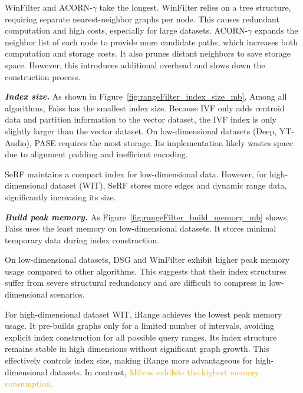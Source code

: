 \documentclass[sigconf, nonacm]{acmart}
\begin{document}
	
	WinFilter and ACORN-\(\gamma\) take the longest.
	WinFilter relies on a tree structure, requiring separate nearest-neighbor graphs per node. This causes redundant computation and high costs, especially for large datasets.
	ACORN-\(\gamma\) expands the neighbor list of each node to provide more candidate paths, which increases both computation and storage costs. It also prunes distant neighbors to save storage space. However, this introduces additional overhead and slows down the construction process.
	
	\textit{\textbf{Index size.}} 
	As shown in Figure~\ref{fig:rangeFilter_index_size_mb}, Among all algorithms, Faiss has the smallest index size. Because IVF only adds centroid data and partition information to the vector dataset, the IVF index is only slightly larger than the vector dataset.
	On low-dimensional datasets (Deep, YT-Audio), PASE requires the most storage. Its implementation likely wastes space due to alignment padding and inefficient encoding. %
	
	SeRF maintains a compact index for low-dimensional data. However, for high-dimensional dataset (WIT), SeRF stores more edges and dynamic range data, significantly increasing its size.
	
	\textit{\textbf{Build peak memory.}}
	As Figure~\ref{fig:rangeFilter_build_memory_mb} shows, Faiss uses the least memory on low-dimensional datasets. It stores minimal temporary data during index construction.
	
	On low-dimensional datasets, DSG and WinFilter exhibit higher peak memory usage compared to other algorithms. This suggests that their index structures suffer from severe structural redundancy and are difficult to compress in low-dimensional scenarios.
	
	
	
	For high-dimensional dataset WIT, iRange achieves the lowest peak memory usage. It pre-builds graphs only for a limited number of intervals, avoiding explicit index construction for all possible query ranges. Its index structure remains stable in high dimensions without significant graph growth. This effectively controls index size, making iRange more advantageous for high-dimensional datasets.
	In contrast, \textcolor{orange}{Milvus exhibits the highest memory consumption,}
	
\end{document}
